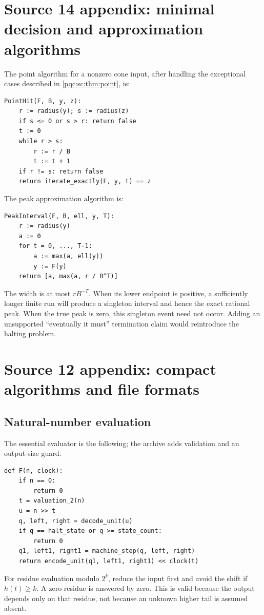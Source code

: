 \documentclass[11pt,letterpaper]{article}
\numberwithin{equation}{section}
\theoremstyle{definition}
\theoremstyle{remark}
\begin{document}
\section{Source 14 appendix: minimal decision and approximation algorithms}

The point algorithm for a nonzero cone input, after handling the exceptional
cases described in \cref{pqc:sc:thm:point}, is:
\begin{lstlisting}
PointHit(F, B, y, z):
    r := radius(y); s := radius(z)
    if s <= 0 or s > r: return false
    t := 0
    while r > s:
        r := r / B
        t := t + 1
    if r != s: return false
    return iterate_exactly(F, y, t) == z
\end{lstlisting}

\noindent\begin{minipage}{\linewidth}
The peak approximation algorithm is:
\begin{lstlisting}
PeakInterval(F, B, ell, y, T):
    r := radius(y)
    a := 0
    for t = 0, ..., T-1:
        a := max(a, ell(y))
        y := F(y)
    return [a, max(a, r / B^T)]
\end{lstlisting}
\end{minipage}
The width is at most $rB^{-T}$. When its lower endpoint is positive, a
sufficiently longer finite run will produce a singleton interval and hence
the exact rational peak. When the true peak is zero, this singleton event
need not occur. Adding an unsupported ``eventually it must'' termination
claim would reintroduce the halting problem.

\section{Source 12 appendix: compact algorithms and file formats}\label{pqc:ad:app:algorithms}

\subsection{Natural-number evaluation}
The essential evaluator is the following; the archive adds validation and
an output-size guard.
\begin{lstlisting}
def F(n, clock):
    if n == 0:
        return 0
    t = valuation_2(n)
    u = n >> t
    q, left, right = decode_unit(u)
    if q == halt_state or q >= state_count:
        return 0
    q1, left1, right1 = machine_step(q, left, right)
    return encode_unit(q1, left1, right1) << clock(t)
\end{lstlisting}
For residue evaluation modulo $2^k$, reduce the input first and avoid the
shift if $h(t)\ge k$. A zero residue is answered by zero. This is valid
because the output depends only on that residue, not because an unknown
higher tail is assumed absent.
\end{document}
